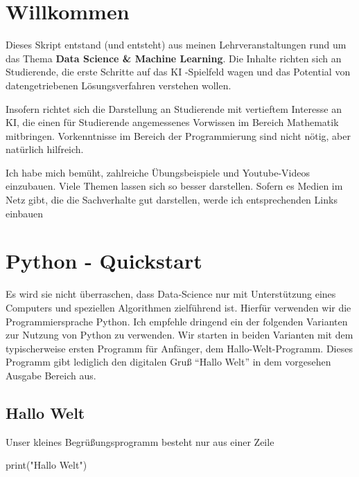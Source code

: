 \documentclass[
  oneside]{book}
\newenvironment{Shaded}{\begin{snugshade}}{\end{snugshade}}
\newcommand{\BuiltInTok}[1]{#1}
\newcommand{\NormalTok}[1]{#1}
\newcommand{\StringTok}[1]{\textcolor[rgb]{0.31,0.60,0.02}{#1}}
\begin{document}
{
\setcounter{tocdepth}{1}
\tableofcontents
}
\hypertarget{willkommen}{%
\chapter*{Willkommen}\label{willkommen}}

Dieses Skript entstand (und entsteht) aus meinen Lehrveranstaltungen rund um das Thema \textbf{Data Science \& Machine Learning}. Die Inhalte richten sich an Studierende, die erste Schritte auf das KI -Spielfeld wagen und das Potential von datengetriebenen Lösungsverfahren verstehen wollen.

Insofern richtet sich die Darstellung an Studierende mit vertieftem Interesse an KI, die einen für Studierende angemessenes Vorwissen im Bereich Mathematik mitbringen. Vorkenntnisse im Bereich der Programmierung sind nicht nötig, aber natürlich hilfreich.

Ich habe mich bemüht, zahlreiche Übungsbeispiele und Youtube-Videos einzubauen. Viele Themen lassen sich so besser darstellen. Sofern es Medien im Netz gibt, die die Sachverhalte gut darstellen, werde ich entsprechenden Links einbauen

\hypertarget{python---quickstart}{%
\chapter{Python - Quickstart}\label{python---quickstart}}

Es wird sie nicht überraschen, dass Data-Science nur mit Unterstützung eines Computers und speziellen Algorithmen zielführend ist. Hierfür verwenden wir die Programmiersprache Python. Ich empfehle dringend ein der folgenden Varianten zur Nutzung von Python zu verwenden. Wir starten in beiden Varianten mit dem typischerweise ersten Programm für Anfänger, dem Hallo-Welt-Programm. Dieses Programm gibt lediglich den digitalen Gruß ``Hallo Welt'' in dem vorgesehen Ausgabe Bereich aus.

\hypertarget{hallo-welt}{%
\section{Hallo Welt}\label{hallo-welt}}

Unser kleines Begrüßungsprogramm besteht nur aus einer Zeile

\begin{Shaded}
\begin{Highlighting}[]
\BuiltInTok{print}\NormalTok{(}\StringTok{"Hallo Welt"}\NormalTok{)}
\end{Highlighting}
\end{Shaded}
\end{document}
